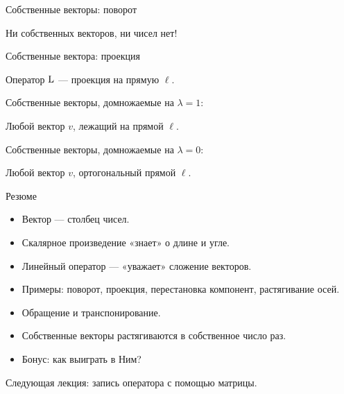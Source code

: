 \begin{frame}{Собственные векторы: поворот}
\begin{center}
\end{center}    
  
\pause


Ни собственных векторов, ни чисел нет!



\end{frame}




\begin{frame}{Собственные вектора: проекция}

Оператор $\operatorname{L}$ — проекция на прямую $\ell$.
\pause

Собственные векторы, домножаемые на $\lambda = 1$:

Любой вектор $v$, лежащий на прямой $\ell$.
\pause

Собственные векторы, домножаемые на  $\lambda = 0$:

Любой вектор $v$, ортогональный прямой $\ell$.


\end{frame}
    

\begin{frame}{Резюме}


\begin{itemize}[<+->]
\item Вектор — столбец чисел.
\item Скалярное произведение «знает» о длине и угле.
\item Линейный оператор — «уважает» сложение векторов.
\item Примеры: поворот, проекция, перестановка компонент, растягивание осей.
\item Обращение и транспонирование. 
\item Собственные векторы растягиваются в собственное число раз.  
\item Бонус: как выиграть в Ним?
\end{itemize}
\pause
\alert{Следующая лекция:} запись оператора с помощью матрицы.



\end{frame}








